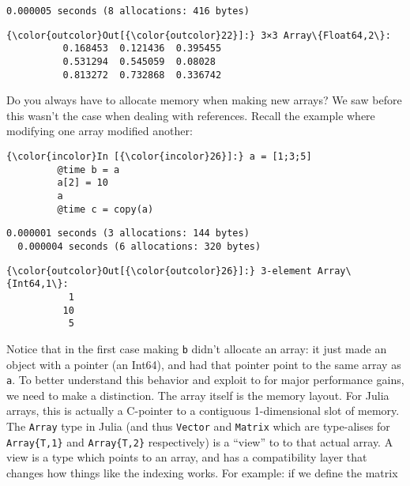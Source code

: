 \documentclass[11pt]{article}
\begin{document}
    \begin{Verbatim}[commandchars=\\\{\}]
  0.000005 seconds (8 allocations: 416 bytes)

    \end{Verbatim}

            \begin{Verbatim}[commandchars=\\\{\}]
{\color{outcolor}Out[{\color{outcolor}22}]:} 3×3 Array\{Float64,2\}:
          0.168453  0.121436  0.395455
          0.531294  0.545059  0.08028 
          0.813272  0.732868  0.336742
\end{Verbatim}
        
    Do you always have to allocate memory when making new arrays? We saw
before this wasn't the case when dealing with references. Recall the
example where modifying one array modified another:

    \begin{Verbatim}[commandchars=\\\{\}]
{\color{incolor}In [{\color{incolor}26}]:} a = [1;3;5]
         @time b = a
         a[2] = 10
         a
         @time c = copy(a)
\end{Verbatim}

    \begin{Verbatim}[commandchars=\\\{\}]
  0.000001 seconds (3 allocations: 144 bytes)
  0.000004 seconds (6 allocations: 320 bytes)

    \end{Verbatim}

            \begin{Verbatim}[commandchars=\\\{\}]
{\color{outcolor}Out[{\color{outcolor}26}]:} 3-element Array\{Int64,1\}:
           1
          10
           5
\end{Verbatim}
        
    Notice that in the first case making \texttt{b} didn't allocate an
array: it just made an object with a pointer (an Int64), and had that
pointer point to the same array as \texttt{a}. To better understand this
behavior and exploit to for major performance gains, we need to make a
distinction. The array itself is the memory layout. For Julia arrays,
this is actually a C-pointer to a contiguous 1-dimensional slot of
memory. The \texttt{Array} type in Julia (and thus \texttt{Vector} and
\texttt{Matrix} which are type-alises for \texttt{Array\{T,1\}} and
\texttt{Array\{T,2\}} respectively) is a ``view'' to to that actual
array. A view is a type which points to an array, and has a
compatibility layer that changes how things like the indexing works. For
example: if we define the matrix
\end{document}
